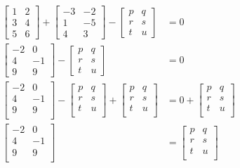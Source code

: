 \documentclass[
  letterpaper,
  DIV=11,
  numbers=noendperiod]{scrartcl}
\begin{document}
\[
\begin{aligned}
\begin{bmatrix}
1 & 2 \\
3 & 4 \\
5 & 6 \end{bmatrix} + \begin{bmatrix}
-3 & -2 \\
1 & -5  \\
4 & 3 \end{bmatrix} - \begin{bmatrix}
p & q \\
r & s  \\
t & u \end{bmatrix} &= 0\\
\begin{bmatrix}
-2 & 0 \\
4 & -1  \\
9 & 9 \end{bmatrix} - \begin{bmatrix}
p & q \\
r & s  \\
t & u \end{bmatrix} &= 0\\
\begin{bmatrix}
-2 & 0 \\
4 & -1  \\
9 & 9 \\
\end{bmatrix} -
\begin{bmatrix}
p & q \\
r & s  \\
t & u \\
\end{bmatrix} +
\begin{bmatrix}
p & q \\
r & s  \\
t & u \\
\end{bmatrix} &= 0 + 
\begin{bmatrix}
p & q \\
r & s  \\
t & u \\
\end{bmatrix}\\ 
\begin{bmatrix}
-2 & 0 \\
4 & -1  \\
9 & 9 \\
\end{bmatrix} &=
\begin{bmatrix}
p & q \\
r & s  \\
t & u \\
\end{bmatrix}
\end{aligned}
\]
\end{document}

